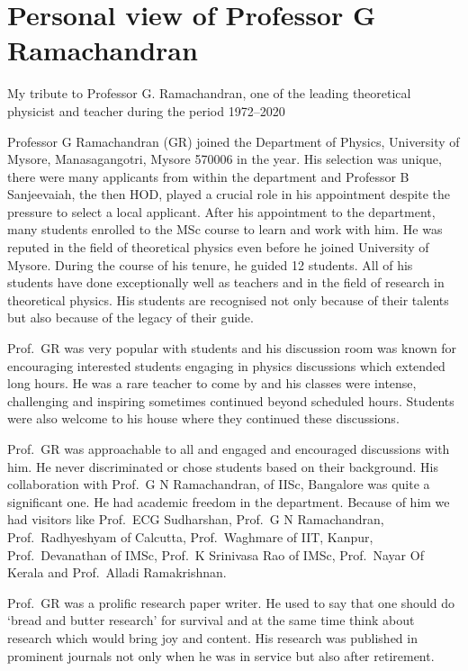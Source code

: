\chapter{Personal view of Professor G Ramachandran}\label{chap19}


My tribute to Professor G. Ramachandran, one of the leading theoretical physicist and teacher during the period 1972--2020
\medskip

Professor G Ramachandran (GR) joined the Department of Physics, University of Mysore, Manasagangotri, Mysore
570006 in the year. His selection was unique, there were many applicants from within the department
and Professor B Sanjeevaiah, the then HOD, played a crucial role in his appointment despite the pressure to
select a local applicant. After his appointment to the department, many students enrolled to the MSc course to
learn and work with him. He was reputed in the field of theoretical physics even before he joined University of
Mysore. During the course of his tenure, he guided 12 students. All of his students have done exceptionally well
as teachers and in the field of research in theoretical physics. His students are recognised not only because of
their talents but also because of the legacy of their guide.

Prof.\ GR was very popular with students and his discussion room was known for encouraging interested students
engaging in physics discussions which extended long hours. He was a rare teacher to come by and his classes were
intense, challenging and inspiring sometimes continued beyond scheduled hours. Students were also welcome to
his house where they continued these discussions.

Prof.\ GR was approachable to all and engaged and encouraged discussions with him. He never discriminated
or chose students based on their background. His collaboration with Prof.\ G N Ramachandran, of IISc, Bangalore was quite a significant one. He had academic freedom in the department. Because of him we had visitors like Prof.\ ECG Sudharshan, Prof.\ G N Ramachandran, Prof.\ Radhyeshyam of Calcutta, Prof.\ Waghmare of IIT,
Kanpur, Prof.\ Devanathan of IMSc, Prof.\ K Srinivasa Rao of IMSc, Prof.\ Nayar Of Kerala and Prof.\ Alladi Ramakrishnan.

Prof.\ GR was a prolific research paper writer. He used to say that one should do `bread and butter research' for survival and at the same time think about research which would bring joy and content. His research was published in prominent journals not only when he was in service but also after retirement.

